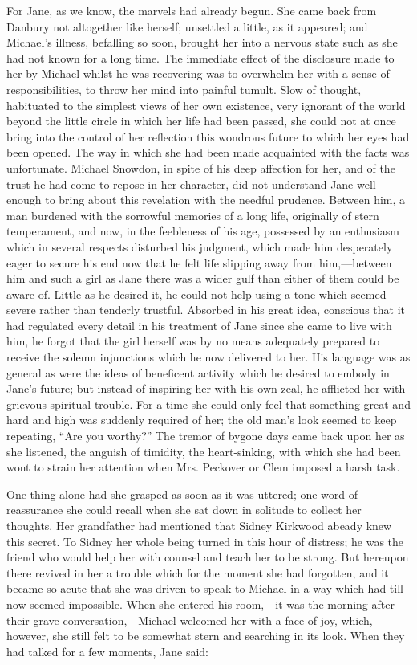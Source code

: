 For Jane, as we know, the marvels had {}already begun. She came back
from Danbury not altogether like herself; unsettled a little, as it
appeared; and Michael's illness, befalling so soon, brought her into a
nervous state such as she had not known for a long time. The immediate
effect of the disclosure made to her by Michael whilst he was recovering
was to overwhelm her with a sense of responsibilities, to throw her mind
into painful tumult. Slow of thought, habituated to the simplest views
of her own existence, very ignorant of the world beyond the little
circle in which her life had been passed, she could not at once bring
into the control of her reflection this wondrous future to which her
eyes had been opened. The way in which she had been made acquainted with
the facts was unfortunate. Michael Snowdon, in spite of his deep
affection for her, and of the trust he had come to repose in her
character, did not understand Jane well enough to bring about this
revelation with the needful prudence. Between him, a man burdened with
the sorrowful memories of a long life, originally of stern
{}temperament, and now, in the feebleness of his age, possessed by an
enthusiasm which in several respects disturbed his judgment, which made
him desperately eager to secure his end now that he felt life slipping
away from him,---between him and such a girl as Jane there was a wider
gulf than either of them could be aware of. Little as he desired it, he
could not help using a tone which seemed severe rather than tenderly
trustful. Absorbed in his great idea, conscious that it had regulated
every detail in his treatment of Jane since she came to live with him,
he forgot that the girl herself was by no means adequately prepared to
receive the solemn injunctions which he now delivered to her. His
language was as general as were the ideas of beneficent activity which
he desired to embody in Jane's future; but instead of inspiring her with
his own zeal, he afflicted her with grievous spiritual trouble. For a
time she could only feel that something great and hard and high was
suddenly required of her; the old man's look seemed to keep repeating,
``Are you worthy?'' {}The tremor of bygone days came back upon her as
she listened, the anguish of timidity, the heart-sinking, with which she
had been wont to strain her attention when Mrs. Peckover or Clem imposed
a harsh task.

One thing alone had she grasped as soon as it was uttered; one word of
reassurance she could recall when she sat down in solitude to collect
her thoughts. Her grandfather had mentioned that Sidney Kirkwood abeady
knew this secret. To Sidney her whole being turned in this hour of
distress; he was the friend who would help her with counsel and teach
her to be strong. But hereupon there revived in her a trouble which for
the moment she had forgotten, and it became so acute that she was driven
to speak to Michael in a way which had till now seemed impossible. When
she entered his room,---it was the morning after their grave
conversation,---Michael welcomed her with a face of joy, which, however,
she still felt to be somewhat stern and searching in its look. When they
had talked for a few moments, Jane said:

